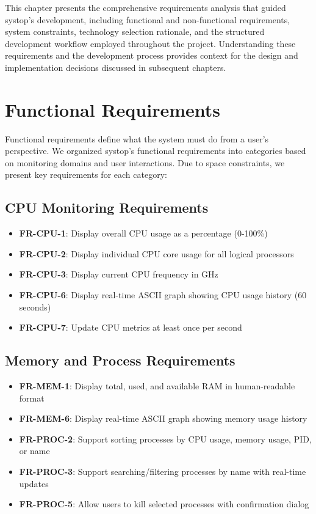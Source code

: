 \documentclass[12pt,a4paper,oneside]{report}
\begin{document}
This chapter presents the comprehensive requirements analysis that guided systop's development, including functional and non-functional requirements, system constraints, technology selection rationale, and the structured development workflow employed throughout the project. Understanding these requirements and the development process provides context for the design and implementation decisions discussed in subsequent chapters.

\section{Functional Requirements}
\label{sec:functional-requirements}

Functional requirements define what the system must do from a user's perspective. We organized systop's functional requirements into categories based on monitoring domains and user interactions. Due to space constraints, we present key requirements for each category:

\subsection{CPU Monitoring Requirements}
\begin{itemize}
    \item \textbf{FR-CPU-1}: Display overall CPU usage as a percentage (0-100\%)
    \item \textbf{FR-CPU-2}: Display individual CPU core usage for all logical processors
    \item \textbf{FR-CPU-3}: Display current CPU frequency in GHz
    \item \textbf{FR-CPU-6}: Display real-time ASCII graph showing CPU usage history (60 seconds)
    \item \textbf{FR-CPU-7}: Update CPU metrics at least once per second
\end{itemize}

\subsection{Memory and Process Requirements}
\begin{itemize}
    \item \textbf{FR-MEM-1}: Display total, used, and available RAM in human-readable format
    \item \textbf{FR-MEM-6}: Display real-time ASCII graph showing memory usage history
    \item \textbf{FR-PROC-2}: Support sorting processes by CPU usage, memory usage, PID, or name
    \item \textbf{FR-PROC-3}: Support searching/filtering processes by name with real-time updates
    \item \textbf{FR-PROC-5}: Allow users to kill selected processes with confirmation dialog
\end{itemize}
\end{document}
